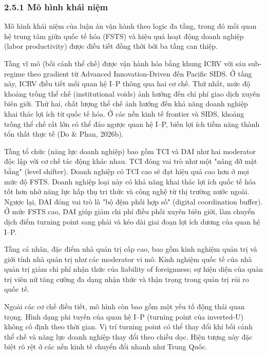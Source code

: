 \documentclass[12pt,a4paper]{article}
\begin{document}
\hypertarget{251-muxf4-huxecnh-khuxe1i-niux1ec7m}{%
\subsubsection{2.5.1 Mô hình khái
niệm}\label{251-muxf4-huxecnh-khuxe1i-niux1ec7m}}

Mô hình khái niệm của luận án vận hành theo logic đa tầng, trong đó mối
quan hệ trung tâm giữa quốc tế hóa (FSTS) và hiệu quả hoạt động doanh
nghiệp (labor productivity) được điều tiết đồng thời bởi ba tầng can
thiệp.

Tầng vĩ mô (bối cảnh thể chế) được vận hành hóa bằng khung ICRV với sáu
sub-regime theo gradient từ Advanced Innovation-Driven đến Pacific SIDS.
Ở tầng này, ICRV điều tiết mối quan hệ I--P thông qua hai cơ chế. Thứ
nhất, mức độ khoảng trống thể chế (institutional voids) ảnh hưởng đến
chi phí giao dịch xuyên biên giới. Thứ hai, chất lượng thể chế ảnh hưởng
đến khả năng doanh nghiệp khai thác lợi ích từ quốc tế hóa. Ở các nền
kinh tế frontier và SIDS, khoảng trống thể chế rất lớn có thể đảo ngược
quan hệ I--P, biến lợi ích tiềm năng thành tổn thất thực tế (Do \& Phan,
2026b).

Tầng tổ chức (năng lực doanh nghiệp) bao gồm TCI và DAI như hai
moderator độc lập với cơ chế tác động khác nhau. TCI đóng vai trò như
một "nâng đỡ mặt bằng" (level shifter). Doanh nghiệp có TCI cao sẽ đạt
hiệu quả cao hơn ở mọi mức độ FSTS. Doanh nghiệp loại này có khả năng
khai thác lợi ích quốc tế hóa tốt hơn nhờ năng lực hấp thụ tri thức và
công nghệ từ thị trường nước ngoài. Ngược lại, DAI đóng vai trò là "bộ
đệm phối hợp số" (digital coordination buffer). Ở mức FSTS cao, DAI giúp
giảm chi phí điều phối xuyên biên giới, làm chuyển dịch điểm turning
point sang phải và kéo dài giai đoạn lợi ích dương của quan hệ I--P.

Tầng cá nhân, đặc điểm nhà quản trị cấp cao, bao gồm kinh nghiệm quản
trị và giới tính nhà quản trị như các moderator vi mô. Kinh nghiệm quốc
tế của nhà quản trị giảm chi phí nhận thức của liability of foreignness;
sự hiện diện của quản trị viên nữ tăng cường đa dạng nhận thức và thận
trọng trong quản trị rủi ro quốc tế.

Ngoài các cơ chế điều tiết, mô hình còn bao gồm một yếu tố động thái
quan trọng. Hình dạng phi tuyến của quan hệ I--P (turning point của
inverted-U) không cố định theo thời gian. Vị trí turning point có thể
thay đổi khi bối cảnh thể chế và năng lực doanh nghiệp thay đổi theo
chiều dọc. Hiện tượng này đặc biệt rõ rệt ở các nền kinh tế chuyển đổi
nhanh như Trung Quốc.
\end{document}
